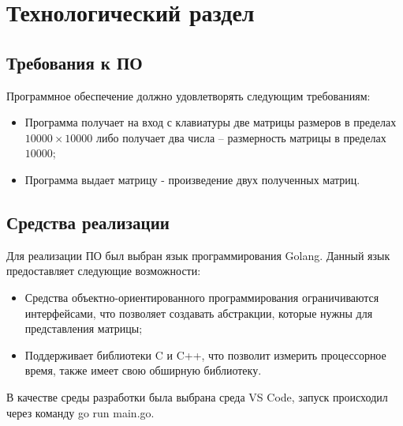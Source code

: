 \chapter{Технологический раздел}

\section{Требования к ПО}

Программное обеспечение должно удовлетворять следующим требованиям:
\begin{itemize}
	\item Программа получает на вход с клавиатуры две матрицы размеров в пределах $10000 \times 10000$ либо получает два числа -- размерность матрицы в пределах $10000$;
	\item Программа выдает матрицу - произведение двух полученных матриц.
\end{itemize}

\section{Средства реализации} 
Для реализации ПО был выбран язык программирования Golang\cite{golang}. Данный язык предоставляет следующие возможности:
\begin{itemize} 
	\item Средства объектно-ориентированного программирования ограничиваются интерфейсами, что позволяет создавать абстракции, которые нужны для представления матрицы;
	\item Поддерживает библиотеки C и C++, что позволит измерить процессорное время, также имеет свою обширную библиотеку.
\end{itemize}

В качестве среды разработки была выбрана среда VS Code\cite{vscode}, запуск происходил через команду go run main.go.

